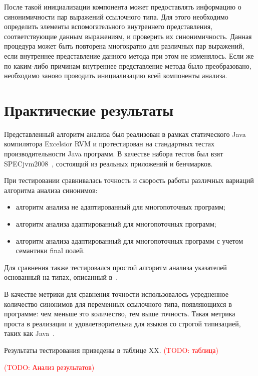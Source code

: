 \documentclass[14pt,titlepage]{extarticle}
\newcommand{\todo}[1]{\textcolor{red}{(\eng{TODO}: #1)}}
\newcommand{\eng}[1]{{\English#1}}
\let\oldsection\section
\renewcommand{\section}{\newpage\oldsection}
\begin{document}
      После такой инициализации компонента может предоставлять информацию о
      синонимичности пар выражений ссылочного типа. Для этого необходимо
      определить элементы вспомогательного внутреннего представления,
      соответствующие данным выражениям, и проверить их синонимичность.
      Данная процедура может быть повторена многократно для
      различных пар выражений, если внутреннее представление данного метода при
      этом не изменялось. Если же по каким-либо причинам внутреннее
      представление метода было преобразовано, необходимо заново проводить
      инициализацию всей компоненты анализа.

  \section{Практические результаты}

    Представленный алгоритм анализа был реализован в рамках статического
    Java компилятора Excelsior RVM и протестирован на стандартных тестах
    производительности Java программ.
    В качестве набора тестов был взят SPECjvm2008~\cite{spec_jvm}, состоящий из
    реальных приложений и бенчмарков.

    При тестировании сравнивалась точность и скорость работы различных вариаций
    алгоритма анализа синонимов:
    \begin{itemize}
      \item алгоритм анализа не адаптированный для многопоточных программ;
      \item алгоритм анализа адаптированный для многопоточных программ;
      \item алгоритм анализа адаптированный для многопоточных программ с
            учетом семантики final полей.
    \end{itemize}
    Для сравнения также тестировался простой алгоритм анализа указателей
    основанный на типах, описанный в~\cite{diwan_tbaa}.

    В качестве метрики для сравнения точности использовалось усредненное
    количество синонимов для переменных ссылочного типа, появляющихся в
    программе: чем меньше это количество, тем выше точность. Такая метрика
    проста в реализации и удовлетворительна для языков со строгой типизацией,
    таких как Java~\cite{hind_pointer_analysis_not_solved_yet}.

    Результаты тестирования приведены в таблице XX.
    \todo{таблица}

    \todo{Анализ результатов}
\end{document}
